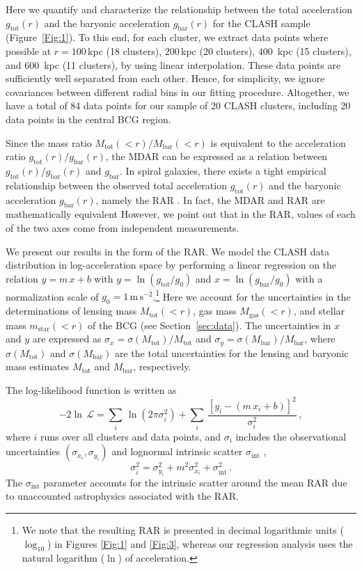 \documentclass[a4paper,iop,twocolumn,twocolappendix,numberedappendix,appendixfloats]{emulateapj}
\newcommand{\Mtot}{M_\mathrm{tot}}
\newcommand{\Mgas}{M_\mathrm{gas}}
\newcommand{\Mbar}{M_\mathrm{bar}}
\newcommand{\gbar}{g_\mathrm{bar}}
\newcommand{\gtot}{g_\mathrm{tot}}
\begin{document}
Here we quantify and characterize the relationship between the total
acceleration $\gtot(r)$ and the baryonic acceleration $\gbar(r)$ for the
CLASH sample (Figure~\ref{Fig:1}).
To this end, for each cluster, we extract data points where possible at
$r=100$\,kpc (18 clusters), $200$\,kpc (20 clusters), $400$\, kpc
(15 clusters), and $600$\, kpc (11 clusters),
by using linear interpolation. These
data points are sufficiently well separated from each other. Hence, for
simplicity, we ignore covariances between different radial bins in our
fitting procedure.
Altogether, we have a total of 84 data points for
our sample of 20 CLASH clusters, including 20 data points in the central
BCG region.

Since the mass ratio $\Mtot(<r)/\Mbar(<r)$ is equivalent to the
acceleration ratio $\gtot(r)/\gbar(r)$,
the MDAR can be expressed as a relation between
$\gtot(r)/\gbar(r)$ and $\gbar$.
In spiral galaxies, there exists a tight empirical relationship between the
observed total acceleration $\gtot(r)$ and the baryonic acceleration
$\gbar(r)$, namely the RAR \citep{McGaugh16}.
In fact, the MDAR and RAR are mathematically equivalent
However, we point out that in the RAR, values of each of the two axes
come from independent measurements.

We present our results in the form of the RAR.
We model the CLASH data distribution in log-acceleration space
by performing a linear regression on the relation
$y=m\,x+b$ with
$y=\ln(\gtot/g_0)$ and
$x=\ln(\gbar/g_0)$ with a normalization scale of
$g_0=1\,\mathrm{m}\,\mathrm{s}^{-2}$.\footnote{We note that the
resulting RAR is presented in decimal logarithmic units ($\log_{10}$) in
Figures \ref{Fig:1} and \ref{Fig:3},
whereas our regression analysis uses the natural logarithm ($\ln$) of
acceleration.}
Here we account for the uncertainties in the determinations of
lensing mass $\Mtot(<r)$,
gas mass $\Mgas(<r)$, and
stellar mass $m_\mathrm{star}(<r)$ of the BCG
(see Section~\ref{sec:data}).
The uncertainties in $x$ and $y$
are expressed as
$\sigma_{x}=\sigma(\Mtot)/\Mtot$
and
$\sigma_{y}=\sigma(\Mbar)/\Mbar$,
where
$\sigma(\Mtot)$ and $\sigma(\Mbar)$ are
the total uncertainties for the lensing and baryonic
mass estimates $\Mtot$ and $\Mbar$, respectively.

The log-likelihood function is written as
\begin{equation}\label{eq:log-likelihood}
 -2\ln\,\mathcal{L}=\sum_{i}\,\ln{(2\pi\sigma^2_{i})}+\sum_{i}\,\frac{[y_i-(m\,x_i+b)]^2}{\sigma^2_{i}}\,,
\end{equation}
where $i$ runs over all clusters and data points, and $\sigma_i$
includes the observational uncertainties $(\sigma_{x_i}, \sigma_{y_i})$ and
lognormal intrinsic scatter $\sigma_\mathrm{int}$ \citep[e.g., see][]{Umetsu16,Okabe16},
\begin{equation}
\label{eq:sigma}
 \sigma^2_{i}=\sigma^2_{y_i}+m^2\sigma^2_{x_i}+\sigma_\mathrm{int}^2\,.
\end{equation}
The $\sigma_\mathrm{int}$ parameter accounts for the intrinsic scatter
around the mean RAR due to unaccounted astrophysics associated with
the RAR.
\end{document}
